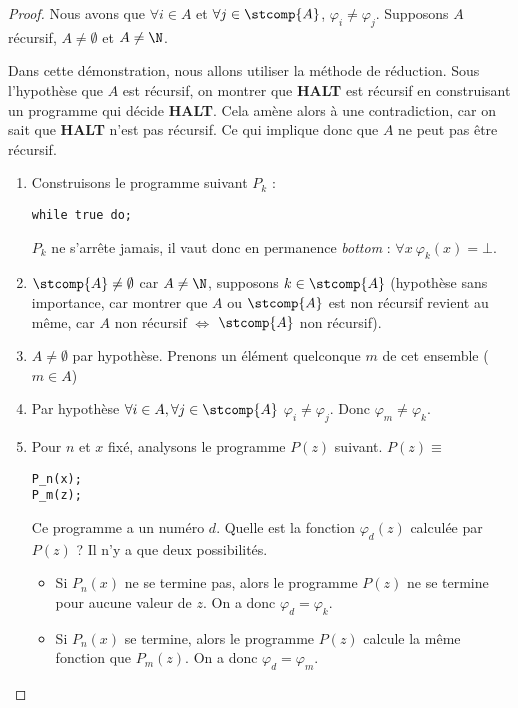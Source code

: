 \begin{proof}
Nous avons que $\forall i \in A$ et $\forall j \in \stcomp{A}$, $\varphi_i \neq
\varphi_j$. Supposons $A$ récursif, $A \neq \emptyset$ et $A\neq \N$.

Dans cette démonstration, nous allons utiliser la méthode de réduction.
Sous l'hypothèse que $A$ est récursif, on montrer que \textbf{HALT} est récursif en construisant un programme qui décide \textbf{HALT}.  Cela amène alors à une contradiction, car on sait que \textbf{HALT} n'est pas récursif.  Ce qui implique donc que $A$ ne peut pas être récursif.

\begin{enumerate}
	\item Construisons le programme suivant $P_k$ :
		\begin{lstlisting}
while true do;
		\end{lstlisting}

			$P_k$ ne s'arrête jamais, il vaut donc en permanence \textit{bottom} : $\forall x \ \varphi_k(x) = \bot$.

	\item $\stcomp{A}\neq \emptyset$ car $A \neq \N$,
	supposons $k\in \stcomp{A}$ (hypothèse sans importance, car montrer que
	$A$ ou $\stcomp{A}$ est non récursif revient au même, car $A$ non
	récursif $ \Leftrightarrow $ $\stcomp{A}$ non récursif).
	\item $A\neq \emptyset$ par hypothèse.  Prenons un élément quelconque $m$ de cet ensemble  ($m\in A$)
	\item Par hypothèse  $\forall i \in A, \forall j \in \stcomp{A}$ $\varphi_i\neq \varphi_j$.  Donc 
		$\varphi_m \neq \varphi_k$.
	\item Pour $n$ et $x$ fixé, analysons le programme $P(z)$ suivant. 
		$P(z) \equiv $
		\begin{lstlisting}
P_n(x);
P_m(z);
		\end{lstlisting}

			Ce programme a un numéro $d$.  Quelle est la fonction $\varphi_d(z)$ calculée par $P(z)$ ? Il n'y a que deux possibilités.
			\begin{itemize}
				\item Si $P_n(x)$ ne se termine pas, alors le programme $P(z)$ ne se termine pour aucune valeur de $z$. On a donc $\varphi_d =\varphi_k$.
				\item Si $P_n(x)$ se termine, alors le programme $P(z)$ calcule la même fonction que $P_m(z)$. On a donc $\varphi_d =\varphi_m$.
			\end{itemize}


\end{enumerate}
\end{proof}
